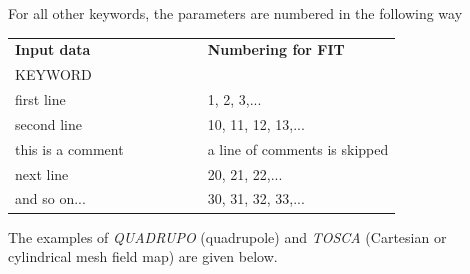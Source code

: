 \noindent For all other keywords, the parameters are numbered in the 
following way 
\begin{center}
{\renewcommand{\arraystretch}{1}
	\begin{tabular}{lcl}
	\textbf{Input  data}  &~~~~~~~~&  \textbf{Numbering  for  FIT}\\
	KEYWORD      &&  \\
	first line   && 1, 2, 3,...\\
	second  line &&  10, 11, 12, 13,...\\
	this  is  a  comment &&  a line of comments is skipped\\
	next line    && 20, 21, 22,...  \\
	and  so  on... && 30, 31, 32, 33,... 
	\end{tabular}    }
\end{center}


\noindent The examples of \textsl{QUADRUPO} (quadrupole) and 
\textsl{TOSCA} (Cartesian or cylindrical mesh field map) are given below.

